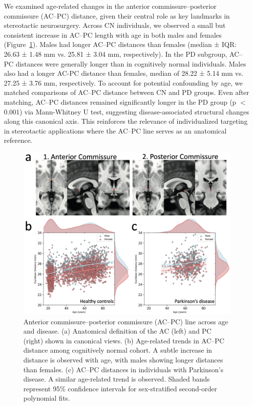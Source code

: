 We examined age-related changes in the anterior commissure–posterior commissure (AC–PC) distance, given their central role as key landmarks in stereotactic neurosurgery. Across CN individuals, we observed a small but consistent increase in AC–PC length with age in both males and females (Figure~\ref{fig:ch3_Figure_acpc}). Males had longer AC–PC distances than females (median ± IQR: 26.63 ± 1.48 mm vs. 25.81 ± 3.04 mm, respectively). In the PD subgroup, AC–PC distances were generally longer than in cognitively normal individuals. Males also had a longer AC-PC distance than females, median of 28.22 ± 5.14 mm vs. 27.25 ± 3.76 mm, respectively. To account for potential confounding by age, we matched comparisons of AC–PC distance between CN and PD groups. Even after matching, AC–PC distances remained significantly longer in the PD group (p \(<\) 0.001) via Mann-Whitney U test, suggesting disease-associated structural changes along this canonical axis. This reinforces the relevance of individualized targeting in stereotactic applications where the AC–PC line serves as an anatomical reference.

\begin{figure}[hbt!]
    \centering
    \includegraphics[width=0.85\linewidth]{figs/ch3_Figure_acpc.png}
    \caption{Anterior commissure–posterior commissure (AC–PC) line across age and disease. (a) Anatomical definition of the AC (left) and PC (right) shown in canonical views. (b) Age-related trends in AC–PC distance among cognitively normal cohort. A subtle increase in distance is observed with age, with males showing longer distances than females. (c) AC–PC distances in individuals with Parkinson’s disease. A similar age-related trend is observed. Shaded bands represent 95\% confidence intervals for sex-stratified second-order polynomial fits.
    }
    \label{fig:ch3_Figure_acpc}
\end{figure}

